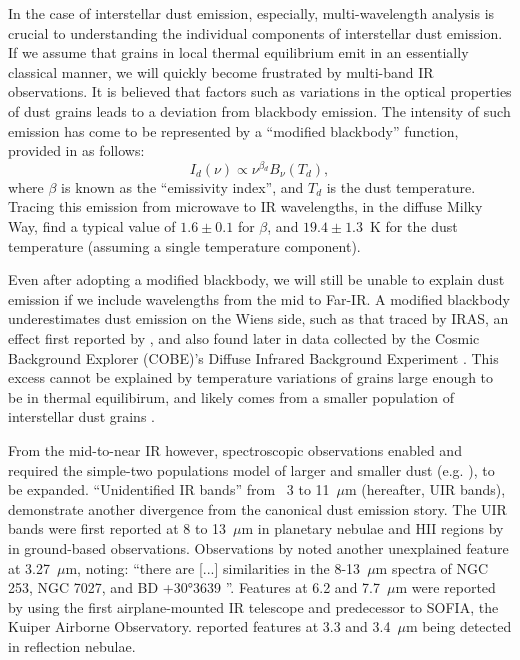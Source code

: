      In the case of interstellar dust emission, especially, multi-wavelength analysis is crucial to understanding the individual components of interstellar dust emission. If we assume that grains in local thermal equilibrium emit in an essentially classical manner, we will quickly become frustrated by multi-band IR observations. It is believed that factors such as variations in the optical properties of dust grains leads to a deviation from blackbody emission. The intensity of such emission has come to be represented by a ``modified blackbody'' function, provided in \cite{onaka99} as follows:
       \begin{equation}
           I_d(\nu) \propto \nu{}^{\beta{}_d}B_\nu{}(T_d),
           \label{eq:mbb}
       \end{equation}
     where $\beta$ is known as the ``emissivity index'', and $T_d$ is the dust temperature. Tracing this emission from microwave to IR wavelengths, in the diffuse Milky Way, \cite{planckIntXXIX16} find a typical value of $1.6 \pm 0.1$ for $\beta$, and $19.4 \pm 1.3$~K for the dust temperature (assuming a single temperature component).

     Even after adopting a modified blackbody, we will still be unable to explain dust emission if we include wavelengths from the mid to Far-IR. A modified blackbody underestimates dust emission on the Wiens side, such as that traced by IRAS, an effect first reported by \cite{boulanger85}, and also found later in data collected by the Cosmic  Background Explorer (COBE)'s Diffuse Infrared Background Experiment \citep{sodroski87, sodroski94}. This excess cannot be explained by temperature variations of grains large enough to be in thermal equilibirum, and likely comes from a smaller population of interstellar dust grains \citep{purcell76, sellgren84,dwek86,draine01}.

     From the mid-to-near IR however, spectroscopic observations enabled and required the simple-two populations model of larger and smaller dust (e.g. \cite{mathis77}), to be expanded. ``Unidentified IR bands'' from~ 3 to 11~$\mu$m (hereafter, UIR bands), demonstrate another divergence from the canonical dust emission story. The UIR bands were first reported at 8 to 13~$\mu$m in planetary nebulae and HII regions by \cite{gillet73, gillett75} in ground-based observations. Observations by \cite{merrill75} noted another unexplained feature at 3.27~$\mu$m, noting: ``there are [...] similarities in the 8-13~$\mu$m spectra of NGC 253, NGC 7027, and BD +30°3639 \cite{gillett75}''. Features at 6.2 and 7.7~$\mu$m were reported by \cite{russell77b} using the first airplane-mounted IR telescope and predecessor to SOFIA, the Kuiper Airborne Observatory. \cite{sellgren83} reported features at 3.3 and 3.4~$\mu$m being detected in reflection nebulae.


